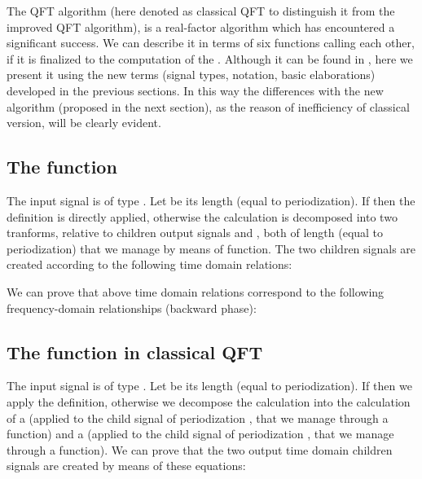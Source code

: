 \documentclass[a4paper,10pt]{article}
\begin{document}
The QFT algorithm \cite{Guo_Sitton_qft_1994} (here denoted as classical QFT to distinguish it from the improved QFT algorithm), is a real-factor algorithm which has encountered a significant success. 
We can describe it in terms of six functions calling each other, if it is finalized to the computation of the . 
Although it can be found in \cite{Guo_Sitton_qft_1994}, here we present it using the new terms (signal types, notation, basic elaborations) developed in the previous sections. 
In this way the differences with the new algorithm (proposed in the next section), as the reason of inefficiency of classical version, will be clearly evident.









\subsection{The  function}

The input signal is of type . Let  be its length (equal to periodization).
If  then the  definition is directly applied, otherwise the  calculation is decomposed into two  tranforms, relative to children output signals  and , both of length  (equal to periodization) that we manage by means of  function.
The two children signals are created according to the following time domain relations:

We can prove that above time domain relations correspond to the following frequency-domain relationships (backward phase):












\subsection{The  function in classical QFT}

The input signal is of type . Let  be its length (equal to periodization).
If  then we apply the  definition, otherwise we decompose the  calculation into the calculation of a  (applied to the child signal  of periodization , that we manage through a  function) and a  (applied to the child signal  of periodization , that we manage through a  function). We can prove that the two output time domain children signals are created by means of these equations:
\end{document}
